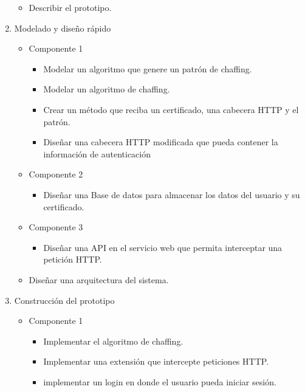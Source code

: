 \documentclass[12pt, a4paper, titlepage]{report}
\begin{document}
\begin{enumerate}
\begin{itemize}
        		        \item Describir el prototipo.
            		\end{itemize}
            	\item Modelado y diseño rápido
            	    \begin{itemize}
            	        \item Componente 1
            	            \begin{itemize}
            	                \item Modelar un algoritmo que genere un patrón de chaffing.
                    	        \item Modelar un algoritmo de chaffing.
                    	        \item Crear un método que reciba un certificado, una cabecera HTTP y el patrón.
                    	        \item Diseñar una cabecera HTTP modificada que pueda contener la información de autenticación 
            	            \end{itemize}
            	        
            	        \item Componente 2
            	            \begin{itemize}
            	                \item Diseñar una Base de datos para almacenar los datos del usuario y su certificado.
            	            \end{itemize}
            	        \item Componente 3
            	            \begin{itemize}
            	                \item Diseñar una API en el servicio web que permita interceptar una petición HTTP.
            	            \end{itemize}
            	        \item Diseñar una arquitectura del sistema.
            	    \end{itemize}
                \item Construcción del prototipo
                    \begin{itemize}
            	        \item Componente 1
            	            \begin{itemize}
            	                \item Implementar el algoritmo de chaffing.
            	                \item Implementar una extensión que intercepte peticiones HTTP.
            	                \item implementar un login en donde el usuario pueda iniciar sesi\'on.
            	            \end{itemize}
            	        

\end{itemize}
\end{enumerate}
\end{document}
